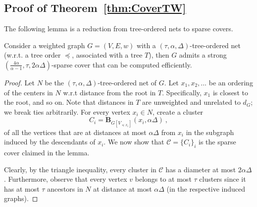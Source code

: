 \documentclass{article}
\def\ball{\mathbf{B}}
\begin{document}
\subsection{Proof of Theorem~\ref{thm:CoverTW}}\label{subsec:covertw}
The following lemma is a reduction from tree-ordered nets to sparse covers.
\begin{lemma}\label{lem:NetToCover}
	Consider a weighted graph $G=(V,E,w)$ with a $(\tau,\alpha,\Delta)$-tree-ordered net (w.r.t. a tree order $\preceq$, associated with a tree $T$), then $G$ admits a  strong 
	 $\left(\frac{4\alpha}{\alpha-1},\tau,2\alpha\Delta\right)$-sparse cover that can be computed efficiently.
\end{lemma}
\begin{proof}Let $N$ be the $(\tau,\alpha,\Delta)$-tree-ordered net of $G$.  Let $x_1,x_2,\dots$ be an ordering of the centers in $N$ w.r.t distance from the root in $T$. Specifically, $x_1$ is closest to the root, and so on. Note that distances in $T$ are unweighted and unrelated to $d_G$; we break ties arbitrarily. For every vertex $x_i\in N$, create a cluster
	\[
	C_{i}=\ball_{G[V_{\preceq x_{i}}]}(x_i,\alpha\Delta)~,
	\]
	of all the vertices that are at distances at most $\alpha\Delta$ from $x_i$ in the subgraph induced by the descendants of $x_i$. We now show that $\mathcal{C} = \{C_i\}_i$ is the sparse cover claimed in the lemma.
	
	
	Clearly, by the triangle inequality, every cluster in $\mathcal{C}$ has a diameter at most $2\alpha\Delta$. Furthermore, observe that every vertex $v$ belongs to at most $\tau$ clusters since it has at most $\tau$ ancestors in $N$ at distance at most $\alpha\Delta$ (in the respective induced graphs).
	

\end{proof}
\end{document}
